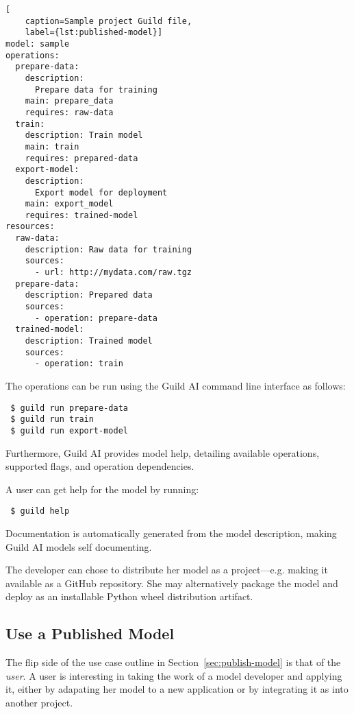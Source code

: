 \documentclass{article}
\begin{document}
\begin{lstlisting}[
    caption=Sample project Guild file,
    label={lst:published-model}]
model: sample
operations:
  prepare-data:
    description:
      Prepare data for training
    main: prepare_data
    requires: raw-data
  train:
    description: Train model
    main: train
    requires: prepared-data
  export-model:
    description:
      Export model for deployment
    main: export_model
    requires: trained-model
resources:
  raw-data:
    description: Raw data for training
    sources:
      - url: http://mydata.com/raw.tgz
  prepare-data:
    description: Prepared data
    sources:
      - operation: prepare-data
  trained-model:
    description: Trained model
    sources:
      - operation: train
\end{lstlisting}

The operations can be run using the Guild AI command line interface as
follows:

{\footnotesize
\begin{verbatim}
 $ guild run prepare-data
 $ guild run train
 $ guild run export-model
\end{verbatim}}

Furthermore, Guild AI provides model help, detailing available
operations, supported flags, and operation dependencies.

A user can get help for the model by running:

{\footnotesize
\begin{verbatim}
 $ guild help
\end{verbatim}}

Documentation is automatically generated from the model description,
making Guild AI models self documenting.

The developer can chose to distribute her model as a
project---e.g. making it available as a GitHub repository. She may
alternatively package the model and deploy as an installable Python
wheel distribution artifact.

\subsection{Use a Published Model}

The flip side of the use case outline in
Section~\ref{sec:publish-model} is that of the \emph{user}. A user is
interesting in taking the work of a model developer and applying it,
either by adapating her model to a new application or by integrating
it as into another project.
\end{document}
